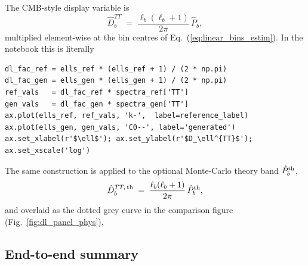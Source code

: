 \documentclass[11pt]{article}
\theoremstyle{definition}
\begin{document}
The CMB-style display variable is
\begin{equation}
  \hat D_b^{TT} \;=\; \frac{\ell_b(\ell_b+1)}{2\pi}\,\hat P_b,
  \label{eq:patch_dell_estim}
\end{equation}
multiplied element-wise at the bin centres of
Eq.~(\ref{eq:linear_bins_estim}). In the notebook this is literally
\begin{lstlisting}[style=nb]
dl_fac_ref = ells_ref * (ells_ref + 1) / (2 * np.pi)
dl_fac_gen = ells_gen * (ells_gen + 1) / (2 * np.pi)
ref_vals   = dl_fac_ref * spectra_ref['TT']
gen_vals   = dl_fac_gen * spectra_gen['TT']
ax.plot(ells_ref, ref_vals, 'k-',  label=reference_label)
ax.plot(ells_gen, gen_vals, 'C0--', label='generated')
ax.set_xlabel(r'$\ell$'); ax.set_ylabel(r'$D_\ell^{TT}$'); ax.set_xscale('log')
\end{lstlisting}
The same construction is applied to the optional Monte‑Carlo theory band
$\hat P_b^{\rm th}$,
\begin{equation}
  \hat D_b^{TT,\,\rm th} \;=\; \frac{\ell_b(\ell_b+1)}{2\pi}\,\hat P_b^{\rm th},
\end{equation}
and overlaid as the dotted grey curve in the comparison figure
(Fig.~\ref{fig:dl_panel_phys}).

\subsection{End-to-end summary}
\label{sec:vf_summary}
\end{document}
